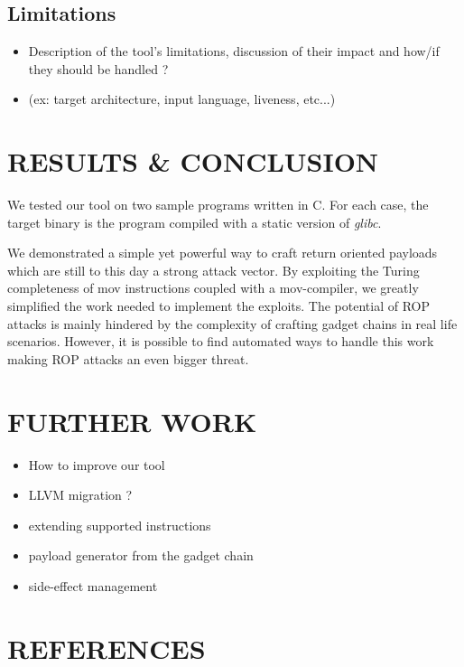 \documentclass[10pt,twocolumn]{article}
\begin{document}
\subsection{Limitations}
\begin{itemize}
    \item Description of the tool's limitations, discussion of their impact and
        how/if they should be handled ?
    \item (ex: target architecture, input language, liveness, etc...)
\end{itemize}



  
\section{RESULTS \& CONCLUSION}
  We tested our tool on two sample programs written in C. For each case, the
  target binary is the program compiled with a static version of \textit{glibc}.

  We demonstrated a simple yet powerful way to craft return oriented payloads
  which are still to this day a strong attack vector. By exploiting the Turing
  completeness of mov instructions coupled with a mov-compiler, we greatly
  simplified the work needed to implement the exploits. The potential of ROP
  attacks is mainly hindered by the complexity of crafting gadget chains in real
  life scenarios. However, it is possible to find automated ways to handle this
  work making ROP attacks an even bigger threat.

\section{FURTHER WORK}
\begin{itemize}
    \item How to improve our tool
    \item LLVM migration ?
    \item extending supported instructions
    \item payload generator from the gadget chain
    \item side-effect management
\end{itemize}


\section{REFERENCES}
\begingroup
\renewcommand{\section}[2]{}


\endgroup
\end{document}
